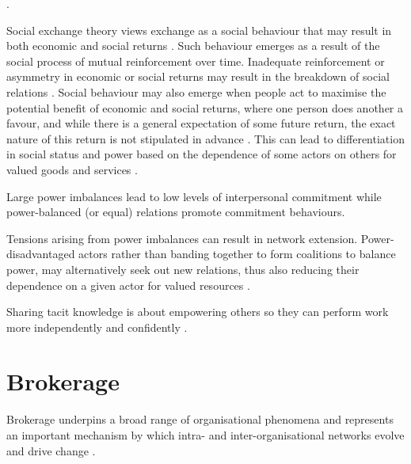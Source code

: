 \citep{conger1988empowerment}.  

Social exchange theory views exchange as a social behaviour that may result in both economic and social returns \citep{lambe2001social}. Such behaviour emerges as a result of the social process of mutual reinforcement over time. Inadequate reinforcement or asymmetry in economic or social returns may result in the breakdown of social relations \citep{homans1961social}. Social behaviour may also emerge when people act to maximise the potential benefit of economic and social returns, where one person does another a favour, and while there is a general expectation of some future return, the exact nature of this return is not stipulated in advance \citep{blau1986exchange}. This can lead to differentiation in social status and power based on the dependence of some actors on others for valued goods and services \citep{emerson1962power}.

Large power imbalances lead to low levels of interpersonal commitment while power-balanced (or equal) relations promote commitment behaviours. 

Tensions arising from power imbalances can result in network extension. Power-disadvantaged actors rather than banding together to form coalitions to balance power, may alternatively seek out new relations, thus  also reducing their dependence on a given actor for valued resources \citep{cook2013social}. 

Sharing tacit knowledge is about empowering others so they can perform work more independently and confidently \citep{bordum2002tacit,lin2007share}. \medskip

 
\section{Brokerage}

Brokerage underpins a broad range of organisational phenomena and represents an important mechanism by which intra- and inter-organisational networks evolve and drive change \citep{obstfeld2002knowledge}. 




